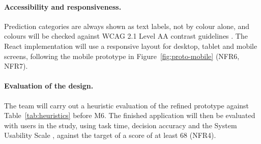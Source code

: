 \paragraph{Accessibility and responsiveness.} Prediction categories are always shown as text labels, not by colour alone, and colours will be checked against WCAG 2.1 Level AA contrast guidelines \parencite{w3c2018wcag21}. The React implementation will use a responsive layout for desktop, tablet and mobile screens, following the mobile prototype in Figure~\ref{fig:proto-mobile} (NFR6, NFR7).

\paragraph{Evaluation of the design.} The team will carry out a heuristic evaluation of the refined prototype against Table~\ref{tab:heuristics} before M6. The finished application will then be evaluated with users in the study, using task time, decision accuracy and the System Usability Scale \parencite{brooke1996sus}, against the target of a score of at least 68 (NFR4).
